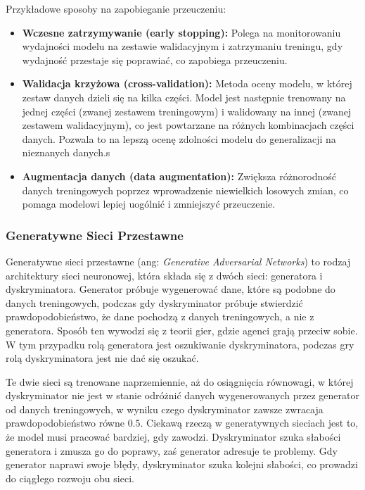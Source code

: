 Przykładowe sposoby na zapobieganie przeuczeniu:

\begin{itemize}
    \item \textbf{Wczesne zatrzymywanie (early stopping):} Polega na monitorowaniu wydajności modelu na zestawie walidacyjnym i zatrzymaniu treningu, gdy wydajność przestaje się poprawiać, co zapobiega przeuczeniu.
    \item \textbf{Walidacja krzyżowa (cross-validation):} Metoda oceny modelu, w której zestaw danych dzieli się na kilka części. Model jest następnie trenowany na jednej części (zwanej zestawem treningowym) i walidowany na innej (zwanej zestawem walidacyjnym), co jest powtarzane na różnych kombinacjach części danych. Pozwala to na lepszą ocenę zdolności modelu do generalizacji na nieznanych danych.s
    \item \textbf{Augmentacja danych (data augmentation):} Zwiększa różnorodność danych treningowych poprzez wprowadzenie niewielkich losowych zmian, co pomaga modelowi lepiej uogólnić i zmniejszyć przeuczenie.
\end{itemize}


\subsubsection*{Generatywne Sieci Przestawne}

Generatywne sieci przestawne (ang: \textit{Generative Adversarial Networks}) to rodzaj architektury sieci neuronowej, która składa się z dwóch sieci: generatora i dyskryminatora. Generator próbuje wygenerować dane, które są podobne do danych treningowych, podczas gdy dyskryminator próbuje stwierdzić prawdopodobieństwo, że dane pochodzą z danych treningowych, a nie z generatora.
Sposób ten wywodzi się z teorii gier, gdzie agenci grają przeciw sobie. W tym przypadku rolą generatora jest oszukiwanie dyskryminatora, podczas gry rolą dyskryminatora jest nie dać się oszukać. 

Te dwie sieci są trenowane naprzemiennie, aż do osiągnięcia równowagi, w której dyskryminator nie jest w stanie odróżnić danych wygenerowanych przez generator od danych treningowych, w wyniku czego dyskryminator zawsze zwracaja prawdopodobieństwo równe $0.5$.
Ciekawą rzeczą w generatywnych sieciach jest to, że model musi pracować bardziej, gdy zawodzi. Dyskryminator szuka słabości generatora i zmusza go do poprawy, zaś generator adresuje te problemy. Gdy generator naprawi swoje błędy, dyskryminator szuka kolejni słabości, co prowadzi do ciągłego rozwoju obu sieci.

